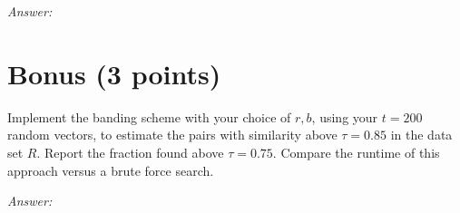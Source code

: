 \documentclass[11pt]{article}
\begin{document}
\emph{Answer:} 


\section{Bonus (3 points)}

Implement the banding scheme with your choice of $r,b$, using your $t=200$ random vectors,  to estimate the pairs with similarity above $\tau = 0.85$ in the data set $R$.  Report the fraction found above $\tau = 0.75$.  Compare the runtime of this approach versus a brute force search.  

\emph{Answer:} 
\end{document}
